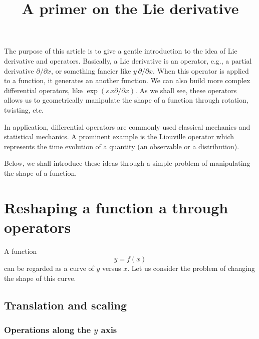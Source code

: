 \documentclass{article}
\begin{document}
\title{A primer on the Lie derivative}
\author{ \vspace{-10ex} }
\date{ \vspace{-10ex} }
\maketitle

\tableofcontents

\vspace{3ex}

The purpose of this article is to give a
gentle introduction to the idea of
Lie derivative and operators.
%
Basically, a Lie derivative is an operator,
e.g., a partial derivative $\partial/\partial x$,
or something fancier like $y \, \partial/\partial x$.
%
When this operator is applied to a function,
it generates an another function.
%
We can also build more complex differential operators, like
$\exp(s \, x \partial/\partial x)$.
%
As we shall see,
these operators allows us to
geometrically manipulate the shape
of a function through rotation, twisting, etc.

In application,
differential operators are commonly used classical mechanics
and statistical mechanics.
%
A prominent example is the Liouville operator
which represents the time evolution of
a quantity (an observable or a distribution).

Below, we shall introduce these ideas through
a simple problem of manipulating the shape of a function.



\section{Reshaping a function a through operators}


A function
\begin{equation}
  y = f(x)
  \label{eq:y_fx}
\end{equation}
can be regarded as a curve of $y$ versus $x$.
Let us consider the problem of changing the shape of this curve.


\subsection{Translation and scaling}
\subsubsection{Operations along the $y$ axis}
\end{document}
